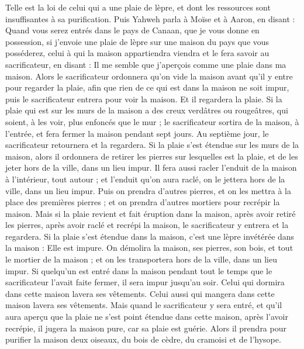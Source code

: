 \begin{multicols}{2}
Telle est la loi de celui qui a une plaie de lèpre, et dont les ressources sont insuffisantes à sa purification.
Puis Yahweh parla à Moïse et à Aaron, en disant :
Quand vous serez entrés dans le pays de Canaan, que je vous donne en possession, si j'envoie une plaie de lèpre sur une maison du pays que vous posséderez,
celui à qui la maison appartiendra viendra et le fera savoir au sacrificateur, en disant : Il me semble que j'aperçois comme une plaie dans ma maison.
Alors le sacrificateur ordonnera qu'on vide la maison avant qu'il y entre pour regarder la plaie, afin que rien de ce qui est dans la maison ne soit impur, puis le sacrificateur entrera pour voir la maison.
Et il regardera la plaie. Si la plaie qui est sur les murs de la maison a des creux verdâtres ou rougeâtres, qui soient, à les voir, plus enfoncés que le mur ;
le sacrificateur sortira de la maison, à l'entrée, et fera fermer la maison pendant sept jours.
Au septième jour, le sacrificateur retournera et la regardera. Si la plaie s'est étendue sur les murs de la maison,
alors il ordonnera de retirer les pierres sur lesquelles est la plaie, et de les jeter hors de la ville, dans un lieu impur.
Il fera aussi racler l'enduit de la maison à l'intérieur, tout autour ; et l'enduit qu'on aura raclé, on le jettera hors de la ville, dans un lieu impur.
Puis on prendra d'autres pierres, et on les mettra à la place des premières pierres ; et on prendra d'autres mortiers pour recrépir la maison.
Mais si la plaie revient et fait éruption dans la maison, après avoir retiré les pierres, après avoir raclé et recrépi la maison,
le sacrificateur y entrera et la regardera. Si la plaie s'est étendue dans la maison, c'est une lèpre invétérée dans la maison : Elle est impure.
On démolira la maison, ses pierres, son bois, et tout le mortier de la maison ; et on les transportera hors de la ville, dans un lieu impur.
Si quelqu'un est entré dans la maison pendant tout le temps que le sacrificateur l'avait faite fermer, il sera impur jusqu'au soir.
Celui qui dormira dans cette maison lavera ses vêtements. Celui aussi qui mangera dans cette maison lavera ses vêtements.
Mais quand le sacrificateur y sera entré, et qu'il aura aperçu que la plaie ne s'est point étendue dans cette maison, après l'avoir recrépie, il jugera la maison pure, car sa plaie est guérie.
Alors il prendra pour purifier la maison deux oiseaux, du bois de cèdre, du cramoisi et de l'hysope.

\end{multicols}

